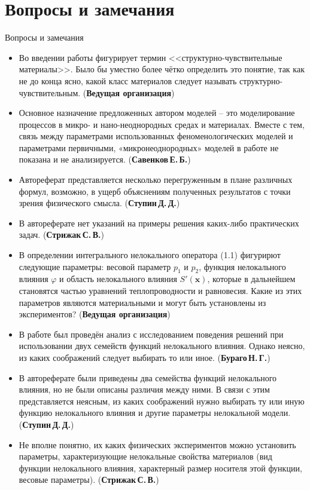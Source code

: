 \section{Вопросы и замечания}
\begin{frame}{Вопросы и замечания}
	\begin{itemize}
		\justifying
		\item Во введении работы фигурирует термин <<структурно-чувствительные материалы>>. Было бы уместно более чётко определить это понятие, так как не до конца ясно, какой класс материалов следует называть структурно-чувствительным. (\textbf{Ведущая организация})
		\item Основное назначение предложенных автором моделей -- это моделирование процессов в микро- и нано-неоднородных средах и материалах. Вместе с тем, связь между параметрами использованных феноменологических моделей и параметрами первичными, «микронеоднородных» моделей в работе не показана и не анализируется. (\textbf{Савенков\,Е.\,Б.})
		\item Автореферат представляется несколько перегруженным в плане различных формул, возможно, в ущерб объяснениям полученных результатов с точки зрения физического смысла. (\textbf{Ступин\,Д.\,Д.})
		\item В автореферате нет указаний на примеры решения каких-либо практических задач. (\textbf{Стрижак\,С.\,В.})
	\end{itemize}
\end{frame}

\begin{frame}
	\begin{itemize}
		\justifying
		\item В определении интегрального нелокального оператора (1.1) фигурирют следующие параметры: весовой параметр $p_1$ и $p_2$, функция нелокального влияния $\varphi$ и область нелокального влияния $S'(\boldsymbol{x})$, которые в дальнейшем становятся частью уравнений теплопроводности и равновесия. Какие из этих параметров являются материальными и могут быть установлены из экспериментов? (\textbf{Ведущая организация})
		\item В работе был проведён анализ с исследованием поведения решений при использовании двух семейств функций нелокального влияния. Однако неясно, из каких соображений следует выбирать то или иное. (\textbf{Бураго\,Н.\,Г.})
		\item В автореферате были приведены два семейства функций нелокального влияния, но не были описаны различия между ними. В связи с этим представляется неясным, из каких соображений нужно выбирать ту или иную функцию нелокального влияния и другие параметры нелокальной модели. (\textbf{Ступин\,Д.\,Д.})
		\item Не вполне понятно, их каких физических экспериментов можно установить параметры, характеризующие нелокальные свойства материалов (вид функции нелокального влияния, характерный размер носителя этой функции, весовые параметры). (\textbf{Стрижак\,С.\,В.})
	\end{itemize}
\end{frame}

